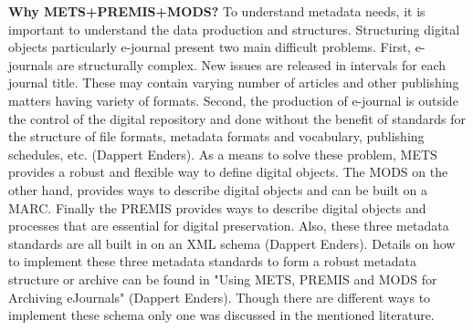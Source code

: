 \begin{enumerate}
	{\bf Why METS+PREMIS+MODS? }
	To understand metadata needs, it is important to understand the data production and structures. Structuring digital objects particularly e-journal present two main difficult problems. First, e-journals are structurally complex. New issues are released in intervals for each journal title. These may contain varying number of articles and other publishing matters having variety of formats. Second, the production of e-journal is outside the control of the digital repository and done without the benefit of standards for the structure of file formats, metadata formats and vocabulary, publishing schedules, etc. (Dappert Enders).
	As a means to solve these problem, METS provides a robust and flexible way to define digital objects. The MODS on the other hand, provides ways to describe digital objects and can be built on a MARC. Finally the PREMIS provides ways to describe digital objects and processes that are essential for digital preservation. Also, these three metadata standards are all built in on an XML schema (Dappert Enders).
	Details on how to implement these three metadata standards to form a robust metadata structure or archive can be found in "Using METS, PREMIS and MODS for Archiving eJournals" (Dappert Enders). Though there are different ways to implement these schema only one was discussed in the mentioned literature.
	

\end{enumerate}
